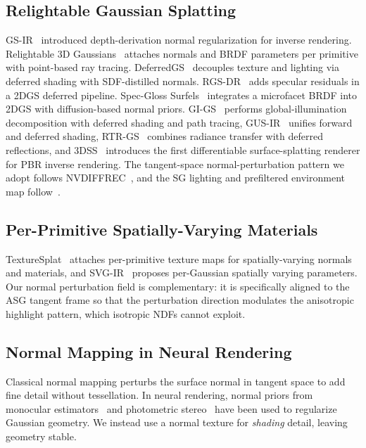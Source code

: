 \documentclass[acmtog, review=true, authorversion=false]{acmart}
\begin{document}
\subsection{Relightable Gaussian Splatting}
GS-IR~\cite{gsir} introduced depth-derivation normal regularization
for inverse rendering. Relightable 3D
Gaussians~\cite{relightable3dgaussians} attaches normals and BRDF
parameters per primitive with point-based ray tracing.
DeferredGS~\cite{deferredgs} decouples texture and lighting via
deferred shading with SDF-distilled normals. RGS-DR~\cite{rgsdr}
adds specular residuals in a 2DGS deferred pipeline. Spec-Gloss
Surfels~\cite{specglosssurfels} integrates a microfacet BRDF into
2DGS with diffusion-based normal priors. GI-GS~\cite{gigs} performs
global-illumination decomposition with deferred shading and path
tracing, GUS-IR~\cite{gusir} unifies forward and deferred shading,
RTR-GS~\cite{rtrgs} combines radiance transfer with deferred
reflections, and 3DSS~\cite{surf3dss} introduces the first
differentiable surface-splatting renderer for PBR inverse rendering.
The tangent-space normal-perturbation pattern we adopt follows
NVDIFFREC~\cite{nvdiffrec}, and the SG lighting and prefiltered
environment map follow~\cite{wang2009sphericalgaussian}.

\subsection{Per-Primitive Spatially-Varying Materials}
TextureSplat~\cite{texturesplat} attaches per-primitive texture maps
for spatially-varying normals and materials, and
SVG-IR~\cite{svgir} proposes per-Gaussian spatially varying
parameters. Our normal perturbation field is complementary: it is
specifically aligned to the ASG tangent frame so that the
perturbation direction modulates the anisotropic highlight pattern,
which isotropic NDFs cannot exploit.

\subsection{Normal Mapping in Neural Rendering}
Classical normal mapping perturbs the surface normal in tangent space
to add fine detail without tessellation. In neural rendering, normal
priors from monocular estimators~\cite{rosgs} and photometric
stereo~\cite{psgs} have been used to regularize Gaussian geometry.
We instead use a normal texture for \emph{shading} detail, leaving
geometry stable.

\end{document}
